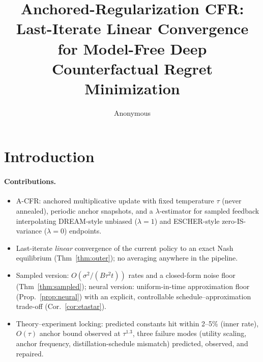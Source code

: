 \documentclass{article}
\title{Anchored-Regularization CFR: Last-Iterate Linear Convergence\\
for Model-Free Deep Counterfactual Regret Minimization}
\author{Anonymous}
\begin{document}
\maketitle

\begin{abstract}
\end{abstract}

\section{Introduction}

\paragraph{Contributions.}
\begin{itemize}
  \item A-CFR: anchored multiplicative update with fixed temperature
        $\tau$ (never annealed), periodic anchor snapshots, and a
        $\lambda$-estimator for sampled feedback interpolating
        DREAM-style unbiased ($\lambda{=}1$) and ESCHER-style
        zero-IS-variance ($\lambda{=}0$) endpoints.
  \item Last-iterate \emph{linear} convergence of the current policy to
        an exact Nash equilibrium (Thm~\ref{thm:outer}); no averaging
        anywhere in the pipeline.
  \item Sampled version: $O(\sigma^2/(B\tau^2 t))$ rates and a
        closed-form noise floor (Thm~\ref{thm:sampled}); neural version:
        uniform-in-time approximation floor
        (Prop.~\ref{prop:neural}) with an explicit, controllable
        schedule--approximation trade-off (Cor.~\ref{cor:etastar}).
  \item Theory--experiment locking: predicted constants hit within
        2--5\% (inner rate), $O(\tau)$ anchor bound observed at
        $\tau^{1.3}$, three failure modes (utility scaling, anchor
        frequency, distillation-schedule mismatch) predicted, observed,
        and repaired.
\end{itemize}
\end{document}
